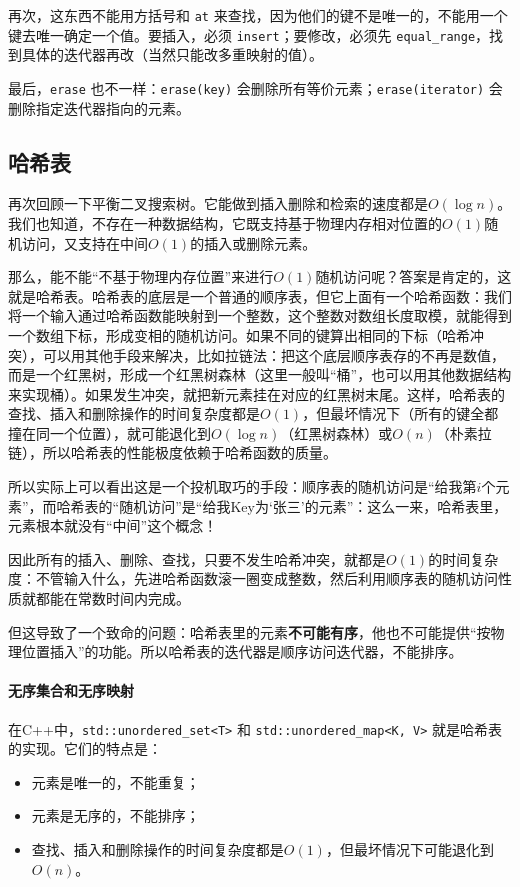 再次，这东西不能用方括号和 \verb|at| 来查找，因为他们的键不是唯一的，不能用一个键去唯一确定一个值。要插入，必须 \verb|insert|；要修改，必须先 \verb|equal_range|，找到具体的迭代器再改（当然只能改多重映射的值）。

最后，\verb|erase| 也不一样：\verb|erase(key)| 会删除所有等价元素；\verb|erase(iterator)| 会删除指定迭代器指向的元素。

\subsection{哈希表}

再次回顾一下平衡二叉搜索树。它能做到插入删除和检索的速度都是$O(\log n)$。我们也知道，不存在一种数据结构，它既支持基于物理内存相对位置的$O(1)$随机访问，又支持在中间$O(1)$的插入或删除元素。

那么，能不能“不基于物理内存位置”来进行$O(1)$随机访问呢？答案是肯定的，这就是哈希表。哈希表的底层是一个普通的顺序表，但它上面有一个哈希函数：我们将一个输入通过哈希函数能映射到一个整数，这个整数对数组长度取模，就能得到一个数组下标，形成变相的随机访问。如果不同的键算出相同的下标（哈希冲突），可以用其他手段来解决，比如拉链法：把这个底层顺序表存的不再是数值，而是一个红黑树，形成一个红黑树森林（这里一般叫“桶”，也可以用其他数据结构来实现桶）。如果发生冲突，就把新元素挂在对应的红黑树末尾。这样，哈希表的查找、插入和删除操作的时间复杂度都是$O(1)$，但最坏情况下（所有的键全都撞在同一个位置），就可能退化到$O(\log n)$（红黑树森林）或$O(n)$（朴素拉链），所以哈希表的性能极度依赖于哈希函数的质量。

所以实际上可以看出这是一个投机取巧的手段：顺序表的随机访问是“给我第$i$个元素”，而哈希表的“随机访问”是“给我Key为‘张三’的元素”：这么一来，哈希表里，元素根本就没有“中间”这个概念！

因此所有的插入、删除、查找，只要不发生哈希冲突，就都是$O(1)$的时间复杂度：不管输入什么，先进哈希函数滚一圈变成整数，然后利用顺序表的随机访问性质就都能在常数时间内完成。

但这导致了一个致命的问题：哈希表里的元素\textbf{不可能有序}，他也不可能提供“按物理位置插入”的功能。所以哈希表的迭代器是顺序访问迭代器，不能排序。

\paragraph{无序集合和无序映射} 在C++中，\verb|std::unordered_set<T>| 和 \verb|std::unordered_map<K, V>| 就是哈希表的实现。它们的特点是：
\begin{itemize}
    \item 元素是唯一的，不能重复；
    \item 元素是无序的，不能排序；
    \item 查找、插入和删除操作的时间复杂度都是$O(1)$，但最坏情况下可能退化到$O(n)$。
\end{itemize}

